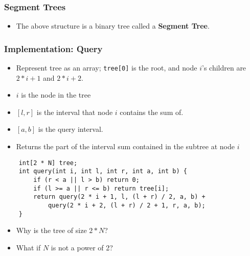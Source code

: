 \documentclass[t,handout]{beamer}
\begin{document}
\begin{frame}
    \frametitle{Segment Trees}
    
    \begin{figure}
        \centering

    \end{figure}
    
    \begin{itemize}
        \item The above structure is a binary tree called a \textbf{Segment Tree}.
    \end{itemize}
\end{frame}

\begin{frame}[fragile]
\frametitle{Implementation: Query}
\begin{itemize}
    \item Represent tree as an array; \texttt{tree[0]} is the root, and node $i$'s children are $2*i + 1$ and $2 * i + 2$.
    \item $i$ is the node in the tree
    \item $[l, r]$ is the interval that node $i$ contains the sum of.
    \item $[a, b]$ is the query interval.
    \item Returns the part of the interval sum contained in the subtree at node $i$
\end{itemize}
\begin{verbatim}
    int[2 * N] tree;
    int query(int i, int l, int r, int a, int b) {
        if (r < a || l > b) return 0;
        if (l >= a || r <= b) return tree[i];
        return query(2 * i + 1, l, (l + r) / 2, a, b) +
            query(2 * i + 2, (l + r) / 2 + 1, r, a, b);
    }
\end{verbatim}
\pause
\begin{itemize}
    \item Why is the tree of size $2 * N$?
    \pause
    \item What if $N$ is not a power of 2?
\end{itemize}
\end{frame}
\end{document}
